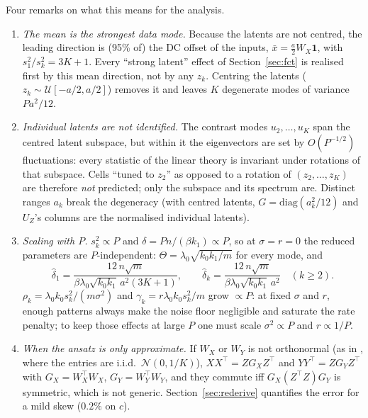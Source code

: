 \documentclass[11pt,a4paper]{article}
\theoremstyle{remark}
\begin{document}
Four remarks on what this means for the analysis.
\begin{enumerate}[nosep]
  \item \emph{The mean is the strongest data mode.} Because the latents are not centred, the leading direction is (95\% of) the DC offset of the inputs, $\bar x = \frac a2W_X\mathbf 1$, with $s_1^2/s_k^2 = 3K+1$. Every ``strong latent'' effect of Section~\ref{sec:fct} is realised first by this mean direction, not by any $z_k$. Centring the latents ($z_k\sim\mathcal U[-a/2,a/2]$) removes it and leaves $K$ degenerate modes of variance $Pa^2/12$.
  \item \emph{Individual latents are not identified.} The contrast modes $u_2,\dots,u_K$ span the centred latent subspace, but within it the eigenvectors are set by $O(P^{-1/2})$ fluctuations: every statistic of the linear theory is invariant under rotations of that subspace. Cells ``tuned to $z_2$'' as opposed to a rotation of $(z_2,\dots,z_K)$ are therefore \emph{not} predicted; only the subspace and its spectrum are. Distinct ranges $a_k$ break the degeneracy (with centred latents, $G = \mathrm{diag}(a_k^2/12)$ and $U_Z$'s columns are the normalised individual latents).
  \item \emph{Scaling with $P$.} $s_k^2\propto P$ and $\delta = Pn/(\beta k_1)\propto P$, so at $\sigma = r = 0$ the reduced parameters are $P$-independent: $\Theta = \lambda_0\sqrt{k_0k_1/m}$ for every mode, and
  \begin{equation}
    \hat\delta_1 = \frac{12\,n\sqrt m}{\beta\lambda_0\sqrt{k_0k_1}\,a^2(3K+1)},\qquad
    \hat\delta_k = \frac{12\,n\sqrt m}{\beta\lambda_0\sqrt{k_0k_1}\,a^2}\quad(k\ge2) .
    \label{eq:Delta-latent}
  \end{equation}
  $\rho_k = \lambda_0k_0s_k^2/(m\sigma^2)$ and $\gamma_k = r\lambda_0k_0s_k^2/m$ grow $\propto P$: at fixed $\sigma$ and $r$, enough patterns always make the noise floor negligible and saturate the rate penalty; to keep those effects at large $P$ one must scale $\sigma^2\propto P$ and $r\propto1/P$.
  \item \emph{When the ansatz is only approximate.} If $W_X$ or $W_Y$ is not orthonormal (as in , where the entries are i.i.d.\ $\mathcal N(0,1/K)$), $XX^\top = ZG_XZ^\top$ and $YY^\top = ZG_YZ^\top$ with $G_X = W_X^\top W_X$, $G_Y = W_Y^\top W_Y$, and they commute iff $G_X(Z^\top Z)G_Y$ is symmetric, which is not generic. Section~\ref{sec:rederive} quantifies the error for a mild skew ($0.2\%$ on $c$).
\end{enumerate}
\end{document}
